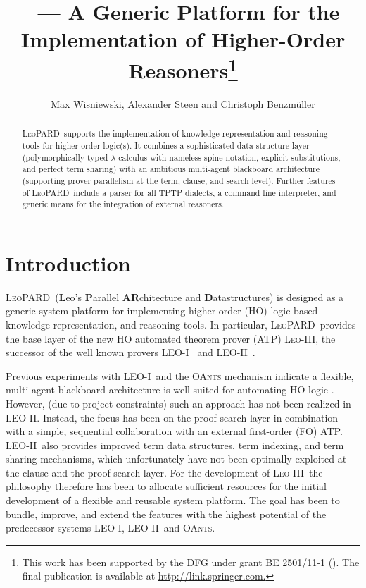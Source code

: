 \documentclass{llncs}
\title{\sys\ --- A Generic Platform for the Implementation of
 Higher-Order Reasoners\thanks{This work has been supported by
    the DFG under grant BE 2501/11-1 (\leoc). The final publication is available at \url{http://link.springer.com.}}}
\author{Max Wisniewski, Alexander Steen and Christoph Benzm\"uller}
\institute{Dept. of Mathematics and Computer Science, 
 Freie Universit\"at Berlin, Germany \\ \email{max.wisniewski|a.steen|c.benzmueller@fu-berlin.de}}
\def\sys{\mbox{\textsc{LeoPARD}}}
\def\leoa{\mbox{\textsc{LEO-I}}}
\def\leob{\mbox{\textsc{LEO-II}}}
\def\leoc{\mbox{\textsc{Leo-III}}}
\begin{document}
\maketitle            


\begin{abstract}
  \sys\ supports the implementation of knowledge
  representation and reasoning tools for higher-order logic(s).  It
  combines a sophisticated data structure layer (polymorphically typed $\lambda$-calculus with nameless spine
  notation, explicit substitutions, and perfect term sharing) with an
  ambitious multi-agent blackboard architecture (supporting
  prover parallelism at the term, clause, and search level). Further
  features of \sys\ include a parser for all TPTP
  dialects, a command line interpreter, and generic means for the
  integration of external reasoners.
\end{abstract}


 \section{Introduction}
 \sys\ (\textbf{L}eo's \textbf{P}arallel \textbf{AR}chitecture and
 \textbf{D}atastructures) is designed as a generic system
 platform for implementing higher-order  (HO) logic based knowledge
 representation, and reasoning tools. In particular, \sys\ provides
 the base layer of the new HO automated theorem prover
 (ATP) \leoc, the successor of the well known provers \leoa\ \cite{C3}
 and \leob\ \cite{C26}. 

Previous experiments with \leoa\ and the \textsc{OAnts} mechanism \cite{C8}
indicate %
a flexible, multi-agent blackboard
 architecture is well-suited for automating HO logic \cite{J16}. However, (due to
 project constraints) such an approach has not been realized in 
 \leob. Instead, the focus has been on the proof search layer in
 combination with a simple, sequential collaboration with an external
 first-order (FO) ATP.
 \leob\ also provides improved term data structures, term indexing,
 and term sharing mechanisms, which unfortunately have not
 been optimally exploited at the clause and the proof search
 layer.  For the development of \leoc\ the philosophy therefore has been to
 allocate sufficient resources for the initial development of a
 flexible and reusable system platform. The goal has been
 to bundle, improve, and extend the features with the highest potential of the
 predecessor systems \leoa, \leob\, and \textsc{OAnts}.
\end{document}
